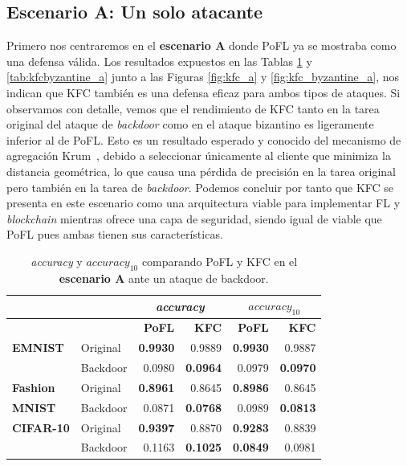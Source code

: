 \subsection{Escenario A: Un solo atacante}\label{sec:kfc_a}

Primero nos centraremos en el \textbf{escenario A} donde \ac{PoFL} ya se mostraba como una defensa válida. Los resultados expuestos en las Tablas \ref{tab:kfcbackdoor_a} y \ref{tab:kfcbyzantine_a} junto a las Figuras \ref{fig:kfc_a} y \ref{fig:kfc_byzantine_a}, nos indican que \ac{KFC} también es una defensa eficaz para ambos tipos de ataques. Si observamos con detalle, vemos que el rendimiento de \ac{KFC} tanto en la tarea original del ataque de \textit{backdoor} como en el ataque bizantino es ligeramente inferior al de \ac{PoFL}. Esto es un resultado esperado y conocido del mecanismo de agregación Krum~\cite{krum-2017}, debido a seleccionar únicamente al cliente que minimiza la distancia geométrica, lo que causa una pérdida de precisión en la tarea original pero también en la tarea de \textit{backdoor}. Podemos concluir por tanto que \ac{KFC} se presenta en este escenario como una arquitectura viable para implementar \ac{FL} y \textit{blockchain} mientras ofrece una capa de seguridad, siendo igual de viable que \ac{PoFL} pues ambas tienen sus características.


\begin{table}[h!]
\centering
\begin{tabular}{llrrrr}
\toprule
 & & \multicolumn{2}{c}{\textit{accuracy}} & \multicolumn{2}{c}{\textit{$accuracy_{10}$}}   \\
 \toprule
\textbf{}     &          & \textbf{PoFL}    & \textbf{KFC} & \textbf{PoFL}    & \textbf{KFC} \\ 
\midrule
\textbf{EMNIST}        & Original &   \textbf{0.9930}&  0.9889& \textbf{0.9930}& 0.9887 \\ 
              & Backdoor &     0.0980& \textbf{0.0964}&    0.0979&     \textbf{ 0.0970} \\ 
\midrule
\textbf{Fashion} & Original &    \textbf{0.8961}& 0.8645&  \textbf{0.8986}&   0.8645    \\ 
\textbf{MNIST}  & Backdoor &   0.0871& \textbf{0.0768}&  0.0989   &  \textbf{0.0813}    \\ 
\midrule
\textbf{CIFAR-10}      & Original & \textbf{0.9397}& 0.8870& \textbf{0.9283}& 0.8839\\ 
                        & Backdoor &  0.1163& \textbf{0.1025}& \textbf{0.0849}&  0.0981\\ 
\bottomrule
\end{tabular}
    \caption{\textit{accuracy} y \textit{$accuracy_{10}$} comparando PoFL y KFC en el \textbf{escenario A} ante un ataque de backdoor.} \label{tab:kfcbackdoor_a}

\end{table}


